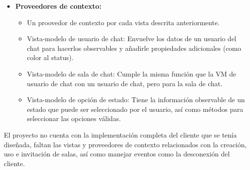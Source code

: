 \begin{itemize}
\begin{itemize}
	\end{itemize}
	\item \textbf{Proveedores de contexto:}
	\begin{itemize}
		\item Un proovedor de contexto por cada vista descrita anteriormente.
		\item Vista-modelo de usuario de chat: Envuelve los datos de un usuario del chat para hacerlos observables y añadirle propiedades adicionales (como color al status).
		\item Vista-modelo de sala de chat: Cumple la misma función que la VM de usuario de chat con un usuario de chat, pero para la sala de chat.
		\item Vista-modelo de opción de estado: Tiene la información observable de un estado que puede ser seleccionado por el usuario, así como métodos para seleccionar las opciones válidas.
	
	\end{itemize}
\end{itemize}

El proyecto no cuenta con la implementación completa del cliente que se tenía diseñada, faltan las vistas y proveedores de contexto relacionados con la creación, uso e invitación de salas, así como manejar eventos como la desconexión del cliente.